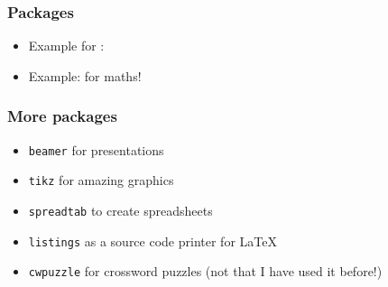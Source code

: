 \begin{frame}[fragile] %
\frametitle{Packages}
\begin{itemize}
\item Example for \color{red}{multicol} \color{black}{}: \\
\end{itemize}
\pause
\begin{itemize}
\item Example: \color{red}{\verb|amsmath|} \color{black}{} for maths! \\
\end{itemize}


\end{frame}

\begin{frame}[fragile]
\frametitle{More packages}
\begin{itemize}
\item \verb|beamer| for presentations  \\
\item \verb|tikz| for amazing graphics \\
\item \verb|spreadtab| to create spreadsheets \\
\item \verb|listings| as a source code printer for \LaTeX \\
\item \verb|cwpuzzle| for crossword puzzles (not that I have used it before!) \\
\end{itemize}
\end{frame}

